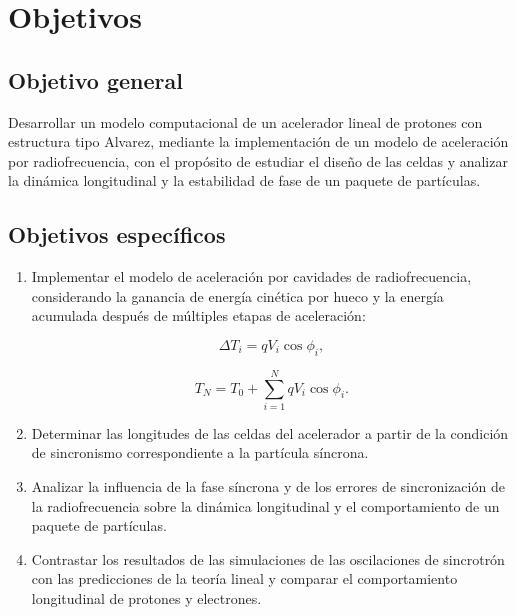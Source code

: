 \chapter{Objetivos}

\section{Objetivo general}

Desarrollar un modelo computacional de un acelerador
lineal de protones con estructura tipo Alvarez, mediante
la implementación de un modelo de aceleración por
radiofrecuencia, con el propósito de estudiar el diseño
de las celdas y analizar la dinámica longitudinal y la
estabilidad de fase de un paquete de partículas.

\section{Objetivos específicos}

\begin{enumerate}

    \item Implementar el modelo de aceleración por cavidades
    de radiofrecuencia, considerando la ganancia de energía
    cinética por hueco y la energía acumulada después de
    múltiples etapas de aceleración:

    \begin{equation}
        \Delta T_i = qV_i\cos\phi_i,
    \end{equation}

    \begin{equation}
        T_N = T_0 + \sum_{i=1}^{N} qV_i\cos\phi_i.
    \end{equation}

    \item Determinar las longitudes de las celdas del
    acelerador a partir de la condición de sincronismo
    correspondiente a la partícula síncrona.

    \item Analizar la influencia de la fase síncrona y
    de los errores de sincronización de la radiofrecuencia
    sobre la dinámica longitudinal y el comportamiento
    de un paquete de partículas.

    \item Contrastar los resultados de las simulaciones
    de las oscilaciones de sincrotrón con las predicciones
    de la teoría lineal y comparar el comportamiento
    longitudinal de protones y electrones.

\end{enumerate}

